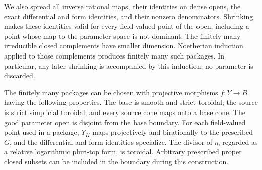 We also spread all inverse rational maps, their identities on dense
opens, the exact differential and form identities, and their nonzero
denominators.  Shrinking makes these identities valid for every
field-valued point of the open, including a point whose map to the
parameter space is not dominant.  The finitely many irreducible closed
complements have smaller dimension.  Noetherian induction applied to
those complements produces finitely many such packages.  In particular,
any later shrinking is accompanied by this induction; no parameter is
discarded.

\begin{proposition}
\label{bounded:preparation}
The finitely many packages can be chosen with projective morphisms
\(f:Y\to B\) having the following properties.  The base is smooth and
strict toroidal; the source is strict simplicial toroidal; and every
source cone maps onto a base cone.  The good parameter open is disjoint
from the base boundary.  For each field-valued point used in a package,
\(Y_K\) maps projectively and birationally to the prescribed \(G\), and
the differential and form identities specialize.  The divisor of
\(\eta\), regarded as a relative logarithmic pluri-top form, is
toroidal.  Arbitrary prescribed proper closed subsets can be included
in the boundary during this construction.
\end{proposition}

